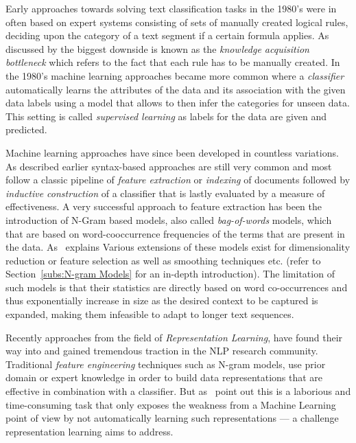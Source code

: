 Early approaches towards solving text classification tasks in the 1980's were in often based on expert systems consisting of sets of manually created logical rules, deciding upon the category of a text segment if a certain formula applies. As discussed by \cite{Sebastiani:2002aa} the biggest downside is known as the \emph{knowledge acquisition bottleneck} which refers to the fact that each rule has to be manually created. In the 1980's machine learning approaches became more common where a \emph{classifier} automatically learns the attributes of the data and its association with the given data labels using a model that allows to then infer the categories for unseen data. This setting is called \emph{supervised learning} as labels for the data are given and predicted.

Machine learning approaches have since been developed in countless variations. As described earlier syntax-based approaches are still very common and most follow a classic pipeline of \emph{feature extraction} or \emph{indexing} of documents followed by \emph{inductive construction} of a classifier that is lastly evaluated by a measure of effectiveness. A very successful approach to feature extraction has been the introduction of N-Gram based models, also called \emph{bag-of-words} models, which that are based on word-cooccurrence frequencies of the terms that are present in the data.
As~\cite{Mikolov:2012aa} explains 
Various extensions of these models exist for dimensionality reduction or feature selection as well as smoothing techniques etc. (refer to Section~\ref{subs:N-gram Models} for an in-depth introduction). The limitation of such models is that their statistics are directly based on word co-occurrences and thus exponentially increase in size as the desired context to be captured is expanded, making them infeasible to adapt to longer text sequences.

Recently approaches from the field of \emph{Representation Learning}, have found their way into and gained tremendous traction in the \gls{NLP} research community. Traditional \emph{feature engineering} techniques such as N-gram models, use prior domain or expert knowledge in order to build data representations that are effective in combination with a classifier. But as~\cite{Bengio:2013aa} point out this is a laborious and time-consuming task that only exposes the weakness from a Machine Learning point of view by not automatically learning such representations --- a challenge representation learning aims to address.

